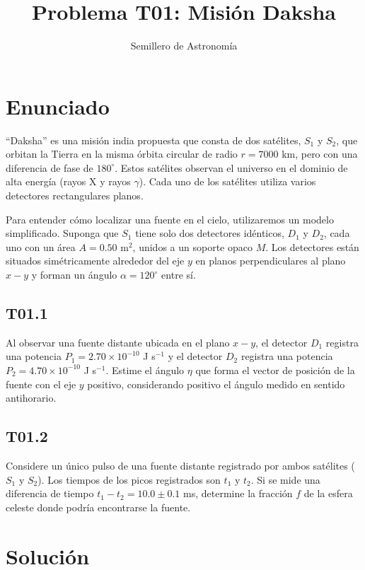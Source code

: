 \documentclass{article}
\title{Problema T01: Misión Daksha}
\author{Semillero de Astronomía}
\date{}
\begin{document}
\maketitle

\section{Enunciado}

``Daksha'' es una misión india propuesta que consta de dos satélites, $S_1$ y $S_2$, que orbitan la Tierra en la misma órbita circular de radio $r = 7000$ km, pero con una diferencia de fase de $180^\circ$. Estos satélites observan el universo en el dominio de alta energía (rayos X y rayos $\gamma$). Cada uno de los satélites utiliza varios detectores rectangulares planos.

Para entender cómo localizar una fuente en el cielo, utilizaremos un modelo simplificado. Suponga que $S_1$ tiene solo dos detectores idénticos, $D_1$ y $D_2$, cada uno con un área $A = 0.50$ m$^2$, unidos a un soporte opaco $M$. Los detectores están situados simétricamente alrededor del eje $y$ en planos perpendiculares al plano $x-y$ y forman un ángulo $\alpha = 120^\circ$ entre sí.

\subsection{T01.1}
Al observar una fuente distante ubicada en el plano $x-y$, el detector $D_1$ registra una potencia $P_1 = 2.70 \times 10^{-10}$ J s$^{-1}$ y el detector $D_2$ registra una potencia $P_2 = 4.70 \times 10^{-10}$ J s$^{-1}$. Estime el ángulo $\eta$ que forma el vector de posición de la fuente con el eje $y$ positivo, considerando positivo el ángulo medido en sentido antihorario.

\subsection{T01.2}
Considere un único pulso de una fuente distante registrado por ambos satélites ($S_1$ y $S_2$). Los tiempos de los picos registrados son $t_1$ y $t_2$. Si se mide una diferencia de tiempo $t_1 - t_2 = 10.0 \pm 0.1$ ms, determine la fracción $f$ de la esfera celeste donde podría encontrarse la fuente.

\section{Solución}
\end{document}
